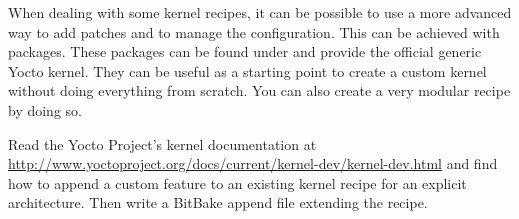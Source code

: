 When dealing with some kernel recipes, it can be possible to use a more advanced
way to add patches and to manage the configuration. This can be achieved with
 packages. These packages can be found under
 and provide the official generic Yocto kernel.
They can be useful as a starting point to create a custom kernel without doing
everything from scratch. You can also create a very modular recipe by doing so.

Read the Yocto Project's kernel documentation at
\url{http://www.yoctoproject.org/docs/current/kernel-dev/kernel-dev.html} and
find how to append a custom feature to an existing kernel recipe for an
explicit architecture. Then write a BitBake append file extending the
 recipe.
